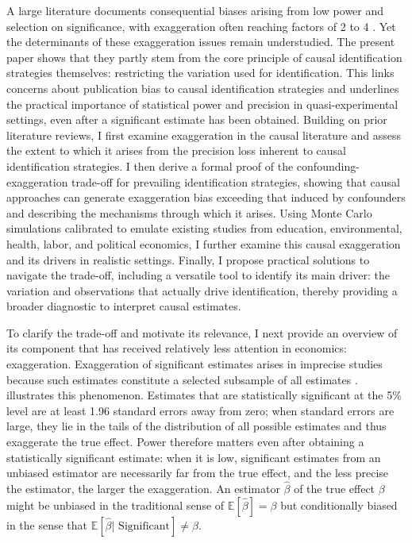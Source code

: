 						
			A large literature documents consequential biases arising from low power and selection on significance, with exaggeration often reaching factors of 2 to 4 \citep[for instance]{ioannidis_power_2017, andrews_identification_2019, ferraro_feature_2020, dellavigna_rcts_2022, young_consistency_2022}. Yet the determinants of these exaggeration issues remain understudied. The present paper shows that they partly stem from the core principle of causal identification strategies themselves: restricting the variation used for identification. This links concerns about publication bias to causal identification strategies and underlines the practical importance of statistical power and precision in quasi-experimental settings, even after a significant estimate has been obtained. Building on prior literature reviews, I first examine exaggeration in the causal literature and assess the extent to which it arises from the precision loss inherent to causal identification strategies. I then derive a formal proof of the confounding-exaggeration trade-off for prevailing identification strategies, showing that causal approaches can generate exaggeration bias exceeding that induced by confounders and describing the mechanisms through which it arises. Using Monte Carlo simulations calibrated to emulate existing studies from education, environmental, health, labor, and political economics, I further examine this causal exaggeration and its drivers in realistic settings. Finally, I propose practical solutions to navigate the trade-off, including a versatile tool to identify its main driver: the variation and observations that actually drive identification, thereby providing a broader diagnostic to interpret causal estimates. %
			
			
			To clarify the trade-off and motivate its relevance, I next provide an overview of its component that has received relatively less attention in economics: exaggeration. Exaggeration of significant estimates arises in imprecise studies because such estimates constitute a selected subsample of all estimates \citep{gelmanType2000}.  illustrates this phenomenon. Estimates that are statistically significant at the 5\% level are at least 1.96 standard errors away from zero; when standard errors are large, they lie in the tails of the distribution of all possible estimates and thus exaggerate the true effect. Power therefore matters even after obtaining a statistically significant estimate: when it is low, significant estimates from an unbiased estimator are necessarily far from the true effect, and the less precise the estimator, the larger the exaggeration. An estimator $\hat{\beta}$ of the true effect $\beta$ might be unbiased in the traditional sense of $\mathbb{E}[\hat{\beta}] = \beta$ but conditionally biased in the sense that $\mathbb{E}[\hat{\beta} | \text{ Significant}] \neq \beta$. 
			
